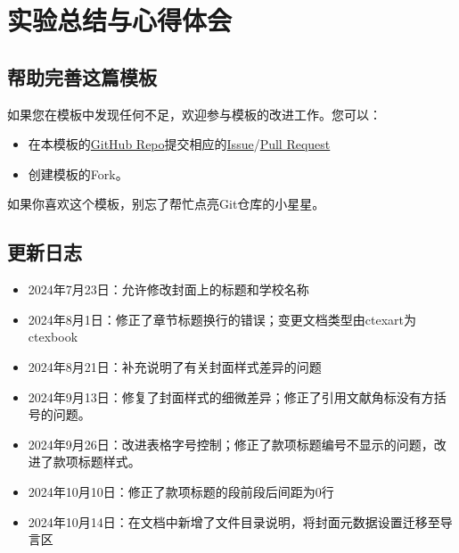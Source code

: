 \chapter{实验总结与心得体会}

\section{帮助完善这篇模板}\label{sec:joinus}

如果您在模板中发现任何不足，欢迎参与模板的改进工作。您可以：

\begin{itemize}
    \item 在本模板的\href{https://github.com/GitHubonline1396529/dlmuucexpreport}{GitHub Repo}提交相应的\href{https://github.com/GitHubonline1396529/dlmuucexpreport/issues}{Issue}/\href{https://github.com/GitHubonline1396529/dlmuucexpreport/pulls}{Pull Request}
    \item 创建模板的Fork。
\end{itemize}

如果你喜欢这个模板，别忘了帮忙点亮Git仓库的小星星。

\section{更新日志}

\begin{itemize}
    \item 2024年7月23日：允许修改封面上的标题和学校名称
    \item 2024年8月1日：修正了章节标题换行的错误；变更文档类型由ctexart为ctexbook
    \item 2024年8月21日：补充说明了有关封面样式差异的问题
    \item 2024年9月13日：修复了封面样式的细微差异；修正了引用文献角标没有方括号的问题。
    \item 2024年9月26日：改进表格字号控制；修正了款项标题编号不显示的问题，改进了款项标题样式。
    \item 2024年10月10日：修正了款项标题的段前段后间距为0行
    \item 2024年10月14日：在文档中新增了文件目录说明，将封面元数据设置迁移至导言区
\end{itemize}